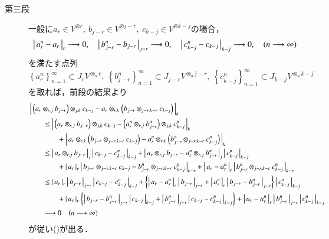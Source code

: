 \begin{prf}
\begin{description}
			\item[第三段]
				一般に$a_r \in V^{\otimes r},\ b_{j-r} \in V^{\otimes j-r},
				\ c_{k-j} \in V^{\otimes k-j}$の場合，
				\begin{align}
					\left|\, a_r^n - a_r\, \right|_{r} \longrightarrow 0,
					\quad \left|\, b_{j-r}^n - b_{j-r}\, \right|_{j-r} \longrightarrow 0,
					\quad \left|\, c_{k-j}^n - c_{k-j}\, \right|_{k-j} \longrightarrow 0,
					\quad (n \longrightarrow \infty)
				\end{align}
				を満たす点列$\left\{ a_r^n \right\}_{n=1}^\infty \subset J_r V^{\otimes_a r},\ 
				\left\{ b_{j-r}^n \right\}_{n=1}^\infty \subset J_{j-r} V^{\otimes_a j-r},\ 
				\left\{ c_{k-j}^n \right\}_{n=1}^\infty \subset J_{k-j} V^{\otimes_a k-j}$
				を取れば，前段の結果より
				\begin{align}
					&\left|\, \left( a_r \otimes_{r,j} b_{j-r} \right) \otimes_{j,k} c_{k-j}
					- a_r \otimes_{r,k} \left( b_{j-r} \otimes_{j-r,k-r} c_{k-j} \right)\, \right|_{k} \\
					&\qquad \leq \left|\, \left( a_r \otimes_{r,j} b_{j-r} \right) \otimes_{j,k} c_{k-j} - \left( a^n_r \otimes_{r,j} b^n_{j-r} \right) \otimes_{j,k} c^n_{k-j}\, \right|_{k} \\
					&\qquad\qquad + \left|\, a_r \otimes_{r,k} \left( b_{j-r} \otimes_{j-r,k-r} c_{k-j} \right) - a^n_r \otimes_{r,k} \left( b^n_{j-r} \otimes_{j-r,k-r} c^n_{k-j} \right)\, \right|_{k} \\
					&\qquad \leq \left|\, a_r \otimes_{r,j} b_{j-r}\, \right|_{j} \left|\, c_{k-j} - c^n_{k-j}\, \right|_{k-j} 
						+ \left|\, a_r \otimes_{r,j} b_{j-r} - a^n_r \otimes_{r,j} b^n_{j-r}\, \right|_{j} \left|\, c^n_{k-j}\, \right|_{k-j} \\
					&\qquad\qquad + \left|\, a_r\, \right|_{r} \left|\, b_{j-r} \otimes_{j-r,k-r} c_{k-j} - b^n_{j-r} \otimes_{j-r,k-r} c^n_{k-j}\, \right|_{k-r}
						+ \left|\, a_r - a_r^n\, \right|_{r} \left|\, b^n_{j-r} \otimes_{j-r,k-r} c^n_{k-j}\, \right|_{k-r} \\
					&\qquad \leq \left|\, a_r\, \right|_{r} \left|\, b_{j-r}\, \right|_{j-r} \left|\, c_{k-j} - c^n_{k-j}\, \right|_{k-j} 
						+ \left\{ \left|\, a_r-a^n_r\, \right|_{r} \left|\, b_{j-r}\, \right|_{j-r} 
						+ \left|\, a^n_r\, \right|_{r} \left|\, b_{j-r} - b^n_{j-r}\, \right|_{j-r} \right\} \left|\, c^n_{k-j}\, \right|_{k-j} \\
					&\qquad\qquad + \left|\, a_r\, \right|_{r} 
						\left\{ \left|\, b_{j-r} - b^n_{j-r}\, \right|_{j-r} \left|\, c_{k-j}\, \right|_{k-j} 
						+ \left|\, b^n_{j-r}\, \right|_{j-r} \left|\, c_{k-j}-c^n_{k-j}\, \right|_{k-j} \right\}
						+ \left|\, a_r - a_r^n\, \right|_{r} \left|\, b^n_{j-r}\, \right|_{j-r} \left|\, c^n_{k-j}\, \right|_{k-j} \\
					&\qquad \longrightarrow 0
					\quad (n \longrightarrow \infty) 
				\end{align}
				が従い()が出る．
				\QED
		\end{description}	
	\end{prf}
	
